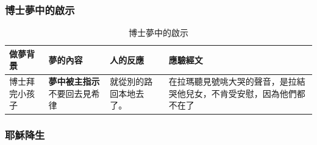 \subsubsection{博士夢中的啟示}
\begin{table}[H]
  \centering
    \begin{tabular}{p{4em}|p{7.2em}|p{6.7em}|p{}}
    \toprule
     \textcolor[rgb]{ .267,  .447,  .769}{\textbf{做夢背景}} 
    & \textcolor[rgb]{ .267,  .447,  .769}{\textbf{夢的內容}}
       & \textcolor[rgb]{ .267,  .447,  .769}{\textbf{人的反應}} 
     & \textcolor[rgb]{ .267,  .447,  .769}{\textbf{應驗經文}} \\ \midrule        
  博士拜完小孩子  &  \textbf{夢中被主指示}不要回去見希律 & 就從別的路回本地去了。&在拉瑪聽見號咷大哭的聲音，是拉結哭他兒女，不肯受安慰，因為他們都不在了\\ %
    \bottomrule
    \end{tabular}%
  \label{tab:addlabel}%
   \caption{博士夢中的啟示}
\end{table}%

\subsubsection{耶穌降生}



